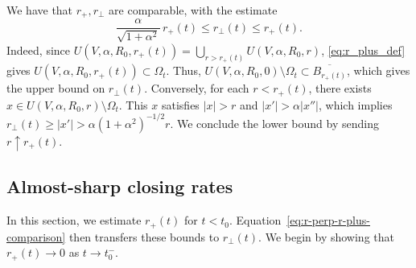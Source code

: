 \documentclass[11pt]{amsart}
\numberwithin{equation}{section}
\numberwithin{figure}{section}
\theoremstyle{plain}
\theoremstyle{definition}
\theoremstyle{remark}
\theoremstyle{plain}
\begin{document}
We have that $r_+, r_\perp$ are comparable, with the estimate
\begin{equation}\label{eq:r-perp-r-plus-comparison}
    \frac{\alpha}{\sqrt{1+\alpha^2}}\,r_+(t)
    \leq r_\perp(t)\leq r_+(t).
\end{equation}
Indeed, since $U(V, \alpha, R_0, r_+(t)) = \bigcup_{r > r_+(t)} U(V, \alpha, R_0, r)$, \eqref{eq:r_plus_def} gives $U(V, \alpha, R_0, r_+(t)) \subset \Omega_t$. Thus, $U(V, \alpha, R_0,0)\setminus \Omega_t \subset \overline{B_{r_+(t)}}$, which gives the upper bound on $r_\perp(t)$. Conversely, for each $r < r_+(t)$, there exists $x\in U(V, \alpha, R_0, r)\setminus \Omega_t$. This $x$ satisfies $|x| > r$ and $|x'| > \alpha |x''|$, which implies $r_\perp(t) \geq |x'| > \alpha (1 + \alpha^2)^{-1/2} r$. We conclude the lower bound by sending $r \uparrow r_+(t)$.

\subsection{Almost-sharp closing rates}
\label{subsec:almost-sharp-closing-rates}

In this section, we estimate $r_+(t)$ for $t<t_0$.
Equation~\eqref{eq:r-perp-r-plus-comparison} then transfers these
bounds to $r_\perp(t)$.
We begin by showing that $r_+(t)\to0$ as $t\to t_0^-$.
\end{document}
